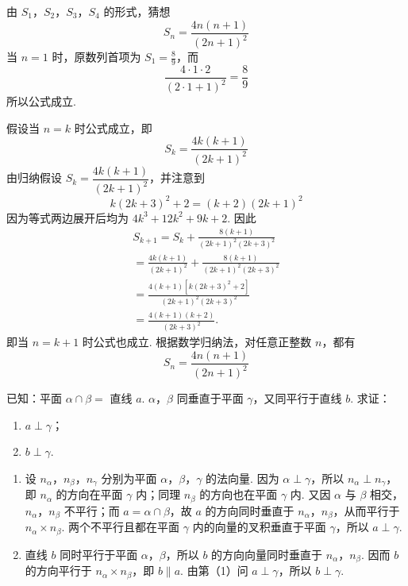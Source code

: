 \begin{solution}
由 \(S_1\)，\(S_2\)，\(S_3\)，\(S_4\) 的形式，猜想
\[
S_n=\frac{4n(n+1)}{(2n+1)^2}
\]
当 \(n=1\) 时，原数列首项为 \(S_1=\frac{8}{9}\)，而
\[
\frac{4\cdot1\cdot2}{(2\cdot1+1)^2}=\frac89
\]
所以公式成立.

假设当 \(n=k\) 时公式成立，即
\[
S_k=\frac{4k(k+1)}{(2k+1)^2}
\]
由归纳假设 \(S_k=\dfrac{4k(k+1)}{(2k+1)^2}\)，并注意到
\[
k(2k+3)^2+2=(k+2)(2k+1)^2
\]
因为等式两边展开后均为 \(4k^3+12k^2+9k+2\). 因此
\[
\begin{gathered}
S_{k+1}=S_k+\frac{8(k+1)}{(2k+1)^2(2k+3)^2}\\
=\frac{4k(k+1)}{(2k+1)^2}
+\frac{8(k+1)}{(2k+1)^2(2k+3)^2}\\
=\frac{4(k+1)\left[k(2k+3)^2+2\right]}
{(2k+1)^2(2k+3)^2}\\
=\frac{4(k+1)(k+2)}{(2k+3)^2}.
\end{gathered}
\]
即当 \(n=k+1\) 时公式也成立. 根据数学归纳法，对任意正整数 \(n\)，都有
\[
S_n=\frac{4n(n+1)}{(2n+1)^2}
\]
\end{solution}

\begin{problem}
已知：平面 \(\alpha\cap\beta=\) 直线 \(a\). \(\alpha\)，\(\beta\) 同垂直于平面 \(\gamma\)，又同平行于直线 \(b\). 求证：

\begin{enumerate}
\item \(a\perp\gamma\)；
\item \(b\perp\gamma\).
\end{enumerate}
\end{problem}

\begin{solution}
\begin{enumerate}
\item 设 \(n_\alpha\)，\(n_\beta\)，\(n_\gamma\) 分别为平面 \(\alpha\)，\(\beta\)，\(\gamma\) 的法向量. 因为 \(\alpha\perp\gamma\)，所以 \(n_\alpha\perp n_\gamma\)，即 \(n_\alpha\) 的方向在平面 \(\gamma\) 内；同理 \(n_\beta\) 的方向也在平面 \(\gamma\) 内. 又因 \(\alpha\) 与 \(\beta\) 相交，\(n_\alpha\)，\(n_\beta\) 不平行；而 \(a=\alpha\cap\beta\)，故 \(a\) 的方向同时垂直于 \(n_\alpha\)，\(n_\beta\)，从而平行于 \(n_\alpha\times n_\beta\). 两个不平行且都在平面 \(\gamma\) 内的向量的叉积垂直于平面 \(\gamma\)，所以 \(a\perp\gamma\).
\item 直线 \(b\) 同时平行于平面 \(\alpha\)，\(\beta\)，所以 \(b\) 的方向向量同时垂直于 \(n_\alpha\)，\(n_\beta\). 因而 \(b\) 的方向平行于 \(n_\alpha\times n_\beta\)，即 \(b\parallel a\). 由第（1）问 \(a\perp\gamma\)，所以 \(b\perp\gamma\).
\end{enumerate}
\end{solution}

